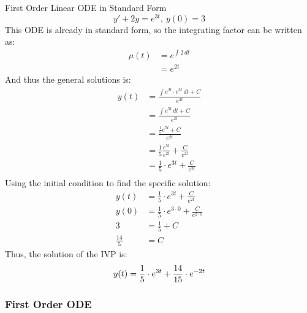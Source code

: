 \documentclass[12pt]{article}
\begin{document}
\begin{example}{First Order Linear ODE in Standard Form}
  \begin{equation*}
    y' + 2y = e^{3t},\ y(0) = 3
  \end{equation*}
  This ODE is already in standard form, so the integrating factor can be written as:
  \begin{align*}
    \mu(t) &= e^{\int_{}^{} 2 \,dt} \\
           &= e^{2t}
  \end{align*}
  And thus the general solutions is:
  \begin{align*}
    y(t) &= \frac{\int_{}^{} e^{2t} \cdot e^{3t} \,dt + C}{e^{2t}} \\
         &= \frac{\int_{}^{} e^{5t} \,dt + C}{e^{2t}} \\
         &= \frac{\frac{1}{5} e^{5t} + C}{e^{2t}} \\
         &= \frac{1}{5} \frac{e^{5t}}{e^{2t}} + \frac{C}{e^{2t}} \\
         &= \frac{1}{5} \cdot e^{3t} + \frac{C}{e^{2t}} \\
  \end{align*}
  Using the initial condition to find the specific solution:
  \begin{align*}
    y(t) &= \frac{1}{5} \cdot e^{3t} + \frac{C}{e^{2t}} \\
    y(0) &= \frac{1}{5} \cdot e^{3 \cdot 0} + \frac{C}{e^{2 \cdot 0}} \\
    3    &= \frac{1}{5} + C \\
    \frac{14}{5} &= C
  \end{align*}
  Thus, the solution of the IVP is:
  \begin{equation*}
    y(t) = \frac{1}{5} \cdot e^{3t} + \frac{14}{15} \cdot e^{-2t} \\
  \end{equation*}
\end{example}

\subsubsection{First Order ODE}
\label{sssec:firstOrderODE}
\end{document}
